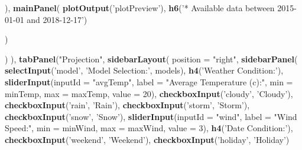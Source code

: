 \documentclass[]{article}
\newenvironment{Shaded}{\begin{snugshade}}{\end{snugshade}}
\newcommand{\KeywordTok}[1]{\textcolor[rgb]{0.13,0.29,0.53}{\textbf{#1}}}
\newcommand{\DataTypeTok}[1]{\textcolor[rgb]{0.13,0.29,0.53}{#1}}
\newcommand{\DecValTok}[1]{\textcolor[rgb]{0.00,0.00,0.81}{#1}}
\newcommand{\StringTok}[1]{\textcolor[rgb]{0.31,0.60,0.02}{#1}}
\newcommand{\NormalTok}[1]{#1}
\begin{document}
\begin{Shaded}
\begin{Highlighting}[]
{\NormalTok{                 ), }\KeywordTok{mainPanel}\NormalTok{(}
                   \KeywordTok{plotOutput}\NormalTok{(}\StringTok{'plotPreview'}\NormalTok{),}
                   \KeywordTok{h6}\NormalTok{(}\StringTok{'* Available data between 2015-01-01 and 2018-12-17'}\NormalTok{)}
                   
\NormalTok{                 )}
                 
                 
\NormalTok{               )}
\NormalTok{            ), }
      \KeywordTok{tabPanel}\NormalTok{(}\StringTok{"Projection"}\NormalTok{, }
               \KeywordTok{sidebarLayout}\NormalTok{(}
                 \DataTypeTok{position =} \StringTok{"right"}\NormalTok{,}
                 \KeywordTok{sidebarPanel}\NormalTok{(}
                   \KeywordTok{selectInput}\NormalTok{(}\StringTok{'model'}\NormalTok{, }\StringTok{'Model Selection:'}\NormalTok{, models),}
                   \KeywordTok{h4}\NormalTok{(}\StringTok{'Weather Condition:'}\NormalTok{),}
                   \KeywordTok{sliderInput}\NormalTok{(}\DataTypeTok{inputId =} \StringTok{"avgTemp"}\NormalTok{,}
                               \DataTypeTok{label =} \StringTok{"Average Temperature (c):"}\NormalTok{,}
                               \DataTypeTok{min =}\NormalTok{ minTemp,}
                               \DataTypeTok{max =}\NormalTok{ maxTemp,}
                               \DataTypeTok{value =} \DecValTok{20}\NormalTok{),}
                   \KeywordTok{checkboxInput}\NormalTok{(}\StringTok{'cloudy'}\NormalTok{, }\StringTok{'Cloudy'}\NormalTok{),}
                   \KeywordTok{checkboxInput}\NormalTok{(}\StringTok{'rain'}\NormalTok{, }\StringTok{'Rain'}\NormalTok{),}
                   \KeywordTok{checkboxInput}\NormalTok{(}\StringTok{'storm'}\NormalTok{, }\StringTok{'Storm'}\NormalTok{),}
                   \KeywordTok{checkboxInput}\NormalTok{(}\StringTok{'snow'}\NormalTok{, }\StringTok{'Snow'}\NormalTok{),}
                   \KeywordTok{sliderInput}\NormalTok{(}\DataTypeTok{inputId =} \StringTok{"wind"}\NormalTok{,}
                               \DataTypeTok{label =} \StringTok{"Wind Speed:"}\NormalTok{,}
                               \DataTypeTok{min =}\NormalTok{ minWind,}
                               \DataTypeTok{max =}\NormalTok{ maxWind,}
                               \DataTypeTok{value =} \DecValTok{3}\NormalTok{),}
                   \KeywordTok{h4}\NormalTok{(}\StringTok{'Date Condition:'}\NormalTok{),}
                   \KeywordTok{checkboxInput}\NormalTok{(}\StringTok{'weekend'}\NormalTok{, }\StringTok{'Weekend'}\NormalTok{),}
                   \KeywordTok{checkboxInput}\NormalTok{(}\StringTok{'holiday'}\NormalTok{, }\StringTok{'Holiday'}\NormalTok{)}
                   
}
\end{Highlighting}
\end{Shaded}
\end{document}
